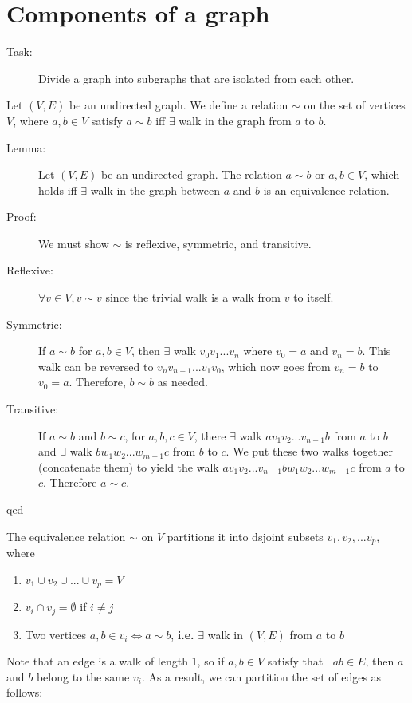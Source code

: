\documentclass[10pt]{article}
\begin{document}
	\section{Components of a graph}
	\begin{description}
		\item[Task:] Divide a graph into subgraphs that are isolated from each other.
	\end{description}
	Let $(V, E)$ be an undirected graph. We define a relation $\sim$ on the set of vertices $V$, where $a, b \in V$ satisfy $a \sim b$ iff $\exists$ walk in the graph from $a$ to $b$.
	\begin{description}
		\item[Lemma:] Let $(V, E)$ be an undirected graph. The relation $a \sim b$ or $a, b \in V$, which holds iff $\exists$ walk in the graph between $a$ and $b$ is an equivalence relation.
		\item[Proof:] We must show $\sim$ is reflexive, symmetric, and transitive.
		\item[Reflexive:] $\forall v \in V, v \sim v$ since the trivial walk is a walk from $v$ to itself.
		\item[Symmetric:] If $a \sim b$ for $a, b \in V$, then $\exists$ walk $v_0 v_1 ... v_n$ where $v_0 = a$ and $v_n = b$. This walk can be reversed to $v_n v_{n-1} ... v_1 v_0$, which now goes from $v_n = b$ to $v_0 = a$. Therefore, $b \sim b$ as needed.
		\item[Transitive:] If $a \sim b$ and $b \sim c$, for $a, b, c \in V$, there $\exists$ walk $a v_1 v_2 ... v_{n-1} b$ from $a$ to $b$ and $\exists$ walk $b w_1 w_2 ... w_{m-1} c$ from $b$ to $c$. We put these two walks together (concatenate them) to yield the walk $a v_1 v_2 ... v_{n-1} b w_1 w_2 ... w_{m-1} c$ from $a$ to $c$. Therefore $a \sim c$.
		\item[qed]
	\end{description}
	The equivalence relation $\sim$ on $V$ partitions it into dsjoint subsets $v_1, v_2, ... v_p$, where
	\begin{enumerate}
		\item $v_1 \cup v_2 \cup ... \cup v_p = V$
		\item $v_i \cap v_j = \emptyset$ if $i \neq j$
		\item Two vertices $a, b \in v_i \Leftrightarrow a \sim b$, \textbf{i.e.} $\exists$ walk in $(V, E)$ from $a$ to $b$
	\end{enumerate}
	Note that an edge is a walk of length 1, so if $a, b \in V$ satisfy that $\exists ab \in E$, then $a$ and $b$ belong to the same $v_i$. As a result, we can partition the set of edges as follows:
\end{document}
